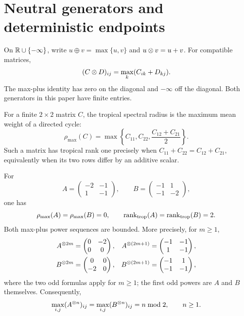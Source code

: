 \section{Neutral generators and deterministic endpoints}
\label{sec:generators}

On $\mathbb{R}\cup\{-\infty\}$, write $u\oplus v=\max\{u,v\}$ and $u\otimes v=u+v$.
For compatible matrices,
\[
 (C\otimes D)_{ij}=\max_k(C_{ik}+D_{kj}).
\]
The max-plus identity has zero on the diagonal and $-\infty$ off the
diagonal.  Both generators in this paper have finite entries.

For a finite $2\times2$ matrix $C$, the tropical spectral radius is the
maximum mean weight of a directed cycle:
\[
 \rho_{\max}(C)=
 \max\left\{C_{11},C_{22},\frac{C_{12}+C_{21}}2\right\}.
\]
Such a matrix has tropical rank one precisely when
$C_{11}+C_{22}=C_{12}+C_{21}$, equivalently when its two rows differ by an
additive scalar.

\begin{proposition}
\label{prop:generators}
For
\[
 A=\begin{pmatrix}-2&-1\\1&-1\end{pmatrix},\qquad
 B=\begin{pmatrix}-1&1\\-1&-2\end{pmatrix},
\]
one has
\[
 \rho_{\max}(A)=\rho_{\max}(B)=0,
 \qquad \operatorname{rank}_{\mathrm{trop}}(A)=\operatorname{rank}_{\mathrm{trop}}(B)=2.
\]
Both max-plus power sequences are bounded.  More precisely, for $m\geq1$,
\begin{align*}
 A^{\otimes 2m}&=\begin{pmatrix}0&-2\\0&0\end{pmatrix},&
 A^{\otimes(2m+1)}&=\begin{pmatrix}-1&-1\\1&-1\end{pmatrix},\\
 B^{\otimes 2m}&=\begin{pmatrix}0&0\\-2&0\end{pmatrix},&
 B^{\otimes(2m+1)}&=\begin{pmatrix}-1&1\\-1&-1\end{pmatrix},
\end{align*}
where the two odd formulas apply for $m\geq1$; the first odd powers are
$A$ and $B$ themselves.  Consequently,
\[
 \max_{i,j}(A^{\otimes n})_{ij}
 =\max_{i,j}(B^{\otimes n})_{ij}=n\bmod2,
 \qquad n\geq1.
\]
\end{proposition}

